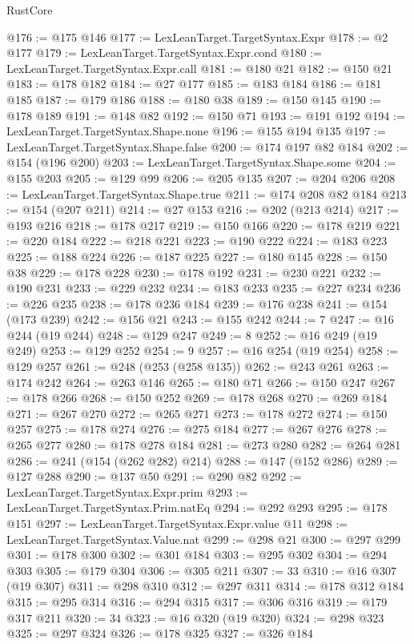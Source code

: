 \begin{lexlean}{RustCore}
\begin{coremodule}
@176 := @175 @146
@177 := LexLeanTarget.TargetSyntax.Expr
@178 := @2 @177
@179 := LexLeanTarget.TargetSyntax.Expr.cond
@180 := LexLeanTarget.TargetSyntax.Expr.call
@181 := @180 @21
@182 := @150 @21
@183 := @178 @182
@184 := @27 @177
@185 := @183 @184
@186 := @181 @185
@187 := @179 @186
@188 := @180 @38
@189 := @150 @145
@190 := @178 @189
@191 := @148 @82
@192 := @150 @71
@193 := @191 @192
@194 := LexLeanTarget.TargetSyntax.Shape.none
@196 := @155 @194 @135
@197 := LexLeanTarget.TargetSyntax.Shape.false
@200 := @174 @197 @82 @184
@202 := @154 (@196 @200)
@203 := LexLeanTarget.TargetSyntax.Shape.some
@204 := @155 @203
@205 := @129 @99
@206 := @205 @135
@207 := @204 @206
@208 := LexLeanTarget.TargetSyntax.Shape.true
@211 := @174 @208 @82 @184
@213 := @154 (@207 @211)
@214 := @27 @153
@216 := @202 (@213 @214)
@217 := @193 @216
@218 := @178 @217
@219 := @150 @166
@220 := @178 @219
@221 := @220 @184
@222 := @218 @221
@223 := @190 @222
@224 := @183 @223
@225 := @188 @224
@226 := @187 @225
@227 := @180 @145
@228 := @150 @38
@229 := @178 @228
@230 := @178 @192
@231 := @230 @221
@232 := @190 @231
@233 := @229 @232
@234 := @183 @233
@235 := @227 @234
@236 := @226 @235
@238 := @178 @236 @184
@239 := @176 @238
@241 := @154 (@173 @239)
@242 := @156 @21
@243 := @155 @242
@244 := 7
@247 := @16 @244 (@19 @244)
@248 := @129 @247
@249 := 8
@252 := @16 @249 (@19 @249)
@253 := @129 @252
@254 := 9
@257 := @16 @254 (@19 @254)
@258 := @129 @257
@261 := @248 (@253 (@258 @135))
@262 := @243 @261
@263 := @174 @242
@264 := @263 @146
@265 := @180 @71
@266 := @150 @247
@267 := @178 @266
@268 := @150 @252
@269 := @178 @268
@270 := @269 @184
@271 := @267 @270
@272 := @265 @271
@273 := @178 @272
@274 := @150 @257
@275 := @178 @274
@276 := @275 @184
@277 := @267 @276
@278 := @265 @277
@280 := @178 @278 @184
@281 := @273 @280
@282 := @264 @281
@286 := @241 (@154 (@262 @282) @214)
@288 := @147 (@152 @286)
@289 := @127 @288
@290 := @137 @50
@291 := @290 @82
@292 := LexLeanTarget.TargetSyntax.Expr.prim
@293 := LexLeanTarget.TargetSyntax.Prim.natEq
@294 := @292 @293
@295 := @178 @151
@297 := LexLeanTarget.TargetSyntax.Expr.value @11
@298 := LexLeanTarget.TargetSyntax.Value.nat
@299 := @298 @21
@300 := @297 @299
@301 := @178 @300
@302 := @301 @184
@303 := @295 @302
@304 := @294 @303
@305 := @179 @304
@306 := @305 @211
@307 := 33
@310 := @16 @307 (@19 @307)
@311 := @298 @310
@312 := @297 @311
@314 := @178 @312 @184
@315 := @295 @314
@316 := @294 @315
@317 := @306 @316
@319 := @179 @317 @211
@320 := 34
@323 := @16 @320 (@19 @320)
@324 := @298 @323
@325 := @297 @324
@326 := @178 @325
@327 := @326 @184

\end{coremodule}
\end{lexlean}
